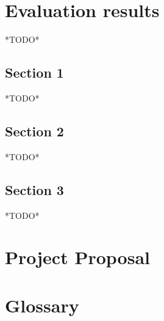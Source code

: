 \documentclass[12pt,twoside,notitlepage]{report}
\begin{document}

\cleardoublepage
\chapter{Evaluation results}
    *TODO*

    \section{Section 1}
    *TODO*

    \section{Section 2}
    *TODO*

    \section{Section 3}
    *TODO*











\cleardoublepage
\chapter{Project Proposal}













\cleardoublepage
\chapter{Glossary}
\glsaddall
\printglossaries
\end{document}
